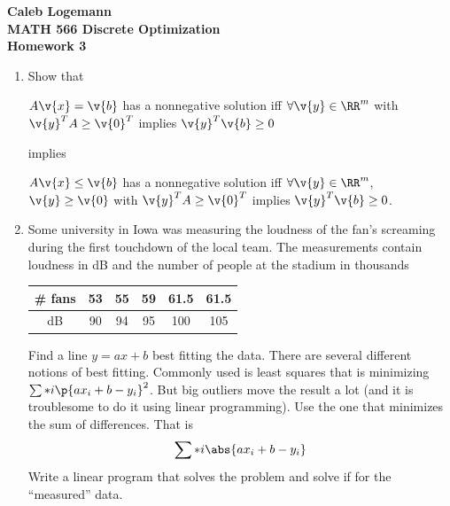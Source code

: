 \documentclass[11pt, oneside]{article}
\begin{document}
\noindent \textbf{\Large{Caleb Logemann \\
MATH 566 Discrete Optimization\\
Homework 3
}}

%
\begin{enumerate}
    \item %
        Show that
        \begin{center}
            $A\v{x} = \v{b}$ has a nonnegative solution iff
            $\forall \v{y} \in \RR^m$ with $\v{y}^T A \ge \v{0}^T$ implies
            $\v{y}^T \v{b} \ge 0$
        \end{center}
        implies
        \begin{center}
            $A\v{x} \le \v{b}$ has a nonnegative solution iff
            $\forall \v{y} \in \RR^m$, $\v{y} \ge \v{0}$ with $\v{y}^T A \ge \v{0}^T$
            implies $\v{y}^T \v{b} \ge 0$.
        \end{center}

    \item %
        Some university in Iowa was measuring the loudness of the fan’s
        screaming during the first touchdown of the local team.
        The measurements contain loudness in dB and the number of people at the
        stadium in thousands
        \begin{center}
            \begin{tabular}{*{6}c}
                \toprule
                \# fans & 53 & 55 & 59 & 61.5 & 61.5 \\
                \midrule
                dB     & 90 & 94 & 95 &  100 &  105 \\
                \bottomrule
            \end{tabular}
        \end{center}
        Find a line $y = ax + b$ best fitting the data.
        There are several different notions of best fitting.
        Commonly used is least squares that is minimizing $\sum*{i}{}{\p{ax_i + b - y_i}^2}$.
        But big outliers move the result a lot (and it is troublesome to do it
        using linear programming).
        Use the one that minimizes the sum of differences. That is
        \[
            \sum*{i}{}{\abs{a x_i + b - y_i}}
        \]
        Write a linear program that solves the problem and solve if for the
        ``measured'' data.


\end{enumerate}
\end{document}
